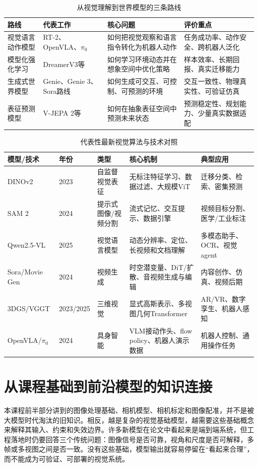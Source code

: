 \documentclass[UTF8,a4paper,12pt]{ctexart}
\newcommand{\model}[1]{\textsf{#1}}
\begin{document}
\begin{table}[htbp]
\centering
\small
\caption{从视觉理解到世界模型的三条路线}
\begin{tabularx}{\textwidth}{C{2.5cm}Y Y Y}
\toprule
\textbf{路线} & \textbf{代表工作} & \textbf{核心问题} & \textbf{评价重点} \\
\midrule
视觉语言动作模型 & RT-2、OpenVLA、$\pi_0$ & 如何把视觉观察和语言指令转化为机器人动作 & 任务成功率、动作安全、跨机器人泛化 \\
模型化强化学习 & DreamerV3等 & 如何学习环境动态并在想象空间中优化策略 & 样本效率、长期回报、真实迁移能力 \\
生成式世界模型 & Genie、Genie 3、Sora路线 & 如何生成可交互、可控制、可预测的环境 & 交互一致性、物理真实性、可验证仿真 \\
表征预测模型 & V-JEPA 2等 & 如何在抽象表征空间中预测未来状态 & 预测稳定性、规划能力、少量真实数据适配 \\
\bottomrule
\end{tabularx}
\end{table}

\begin{table}[htbp]
\centering
\small
\caption{代表性最新视觉算法与技术对照}
\begin{tabularx}{\textwidth}{C{2.45cm}C{1.75cm}C{2.05cm}Y Y}
\toprule
\textbf{模型/技术} & \textbf{年份} & \textbf{类型} & \textbf{核心机制} & \textbf{典型应用} \\
\midrule
\model{DINOv2} & 2023 & 自监督视觉表征 & 无标注特征学习、数据过滤、大规模ViT & 迁移分类、检索、密集预测 \\
\model{SAM 2} & 2024 & 提示式图像/视频分割 & 流式记忆、交互提示、数据引擎 & 视频目标分割、医学/工业标注 \\
\model{Qwen2.5-VL} & 2025 & 视觉语言模型 & 动态分辨率、定位、长视频和文档理解 & 多模态助手、OCR、视觉agent \\
\model{Sora}/\model{Movie Gen} & 2024 & 视频生成 & 时空潜变量、DiT/扩散、音视频生成与编辑 & 内容创作、仿真、视频后期 \\
\model{3DGS}/\model{VGGT} & 2023/2025 & 三维视觉 & 显式高斯表示、多视图几何Transformer & AR/VR、数字孪生、机器人感知 \\
\model{OpenVLA}/$\pi_0$ & 2024 & 具身智能 & VLM接动作头、flow policy、机器人演示数据 & 机器人控制、通用操作任务 \\
\bottomrule
\end{tabularx}
\end{table}

\section{从课程基础到前沿模型的知识连接}
本课程前半部分讲到的图像处理基础、相机模型、相机标定和图像配准，并不是被大模型时代淘汰的旧知识。相反，越是复杂的视觉基础模型，越需要这些基础概念来解释其输入、约束和失效边界。许多新模型在论文中看起来是端到端系统，但工程落地时仍要回答三个传统问题：图像信号是否可靠，视角和尺度是否可解释，多帧或多视图之间是否一致。没有这些基础，模型输出就容易停留在“看起来合理”，而不能成为可验证、可部署的视觉系统。
\end{document}
